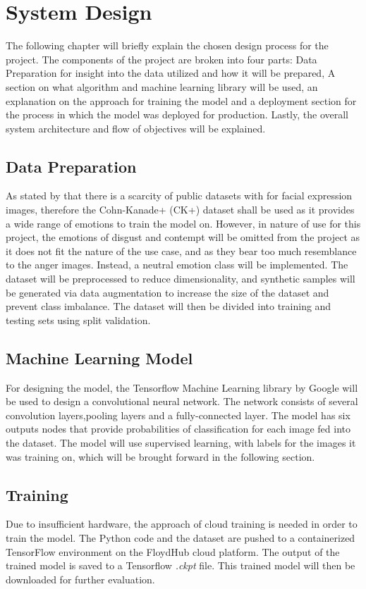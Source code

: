 \chapter{System Design}
The following chapter will briefly explain the chosen design process for the project. The components of the project are broken into four parts: Data Preparation for insight into the data utilized and how it will be prepared, A section on what algorithm and machine learning library will be used, an explanation on the approach for training the model and a deployment section for the process in which the model was deployed for production. Lastly, the overall system architecture and flow of objectives will be explained.

\section{Data Preparation}
As stated by \citeauthor*{LOPES} that there is a scarcity of public datasets with for facial expression images, therefore the Cohn-Kanade+ (CK+) dataset shall be used as it provides a wide range of emotions to train the model on. However, in nature of use for this project, the emotions of disgust and contempt will be omitted from the project as it does not fit the nature of the use case, and as they bear too much resemblance to the anger images. Instead, a neutral emotion class will be implemented.
The dataset will be preprocessed to reduce dimensionality, and synthetic samples will be generated via data augmentation to increase the size of the dataset and prevent class imbalance. The dataset will then be divided into training and testing sets using split validation. 

\section{Machine Learning Model}
For designing the model, the Tensorflow Machine Learning library by Google will be used to design a convolutional neural network. 
The network consists of several convolution layers,pooling layers and a fully-connected layer. The model has six outputs nodes that provide probabilities of classification for each image fed into the dataset. The model will use supervised learning, with labels for the images it was training on, which will be brought forward in the following section.\\

\section{Training}
Due to insufficient hardware, the approach of cloud training is needed in order to train the model. The Python code and the dataset are pushed to a containerized TensorFlow environment on the FloydHub cloud platform. The output of the trained model is saved to a Tensorflow \textit{.ckpt} file. This trained model will then be downloaded for further evaluation.

